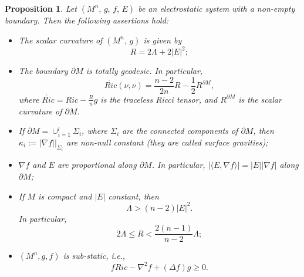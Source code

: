 \documentclass{amsart}
\newtheorem{proposition}{Proposition}
\numberwithin{equation}{section}
\begin{document}
	\begin{proposition}\label{properties}
		Let $(M^n,\,g,\,f,\,E)$ be an electrostatic system with a non-empty boundary. Then the following assertions hold:
		
		\begin{itemize}
			\item[(i)] The scalar curvature of $(M^{n},\,g)$ is given by
			\begin{equation}
			\label{rrr}
			R=2\Lambda+2|E|^{2};
			\end{equation}
			\item[(ii)] The boundary \( \partial M \) is totally geodesic. In particular,
\begin{equation} \label{gausseq}
\mathring{Ric}(\nu, \nu) = \frac{n-2}{2n} R - \frac{1}{2} R^{\partial M},
\end{equation}
where \( \mathring{Ric} = Ric - \frac{R}{n}g \) is the traceless Ricci tensor, and \( R^{\partial M} \) is the scalar curvature of \( \partial M \).

			\item[(iii)] If $\partial M=\displaystyle\cup_{i=1}^{l} \Sigma_{i}$, where $\Sigma_{i}$ are the connected components of $\partial M$, then $\kappa_{i}:=|\nabla f|\Big|_{\Sigma_{i}}$ are non-null constant (they are called surface gravities);
			\item[(iv)] $\nabla f$ and $E$ are proportional along $\partial M$. In particular, $|\langle E,\nabla f\rangle|=|E||\nabla f|$ along $\partial M$;			
			\item[(v)] If $M$ is compact and $\vert E\vert$ constant, then $$\Lambda> \left(n-2\right)|E|^{2}.$$
			In particular, 
			\[
2\Lambda \leq R < \frac{2(n-1)}{n-2} \Lambda;
\]
			\item[(vi)] $(M^n, g, f)$ is sub-static, i.e.,
			\begin{equation}
				fRic-\nabla^2 f+(\Delta f)g\geq 0. \label{sub_static}
			\end{equation}
		\end{itemize}
	\end{proposition}
	
	
\end{document}
